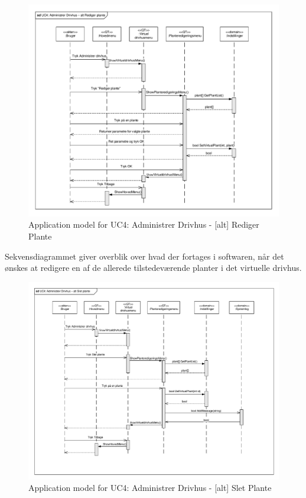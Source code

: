 \begin{figure}[!h]
\centering 
\includegraphics[width={\textwidth}, trim=0 0 0 0, clip=true] {../fig/SD_autoGreen_UC_4_Administrerdrivhus_alt_redigerplante.pdf}
\caption{Application model for UC4: Administrer Drivhus - [alt] Rediger Plante}
\label{fig:SD_UC4_alt1}
\end{figure}

Sekvensdiagrammet giver overblik over hvad der fortages i softwaren, når det ønskes at redigere en af de allerede tilstedeværende planter i det virtuelle drivhus.

\clearpage

\begin{figure}[!h]
\centering 
\includegraphics[width={\textwidth}, trim=0 0 0 0, clip=true] {../fig/SD_autoGreen_UC_4_Administrerdrivhus_alt_sletplante.pdf}
\caption{Application model for UC4: Administrer Drivhus - [alt] Slet Plante}
\label{fig:SD_UC4_alt2}
\end{figure}

